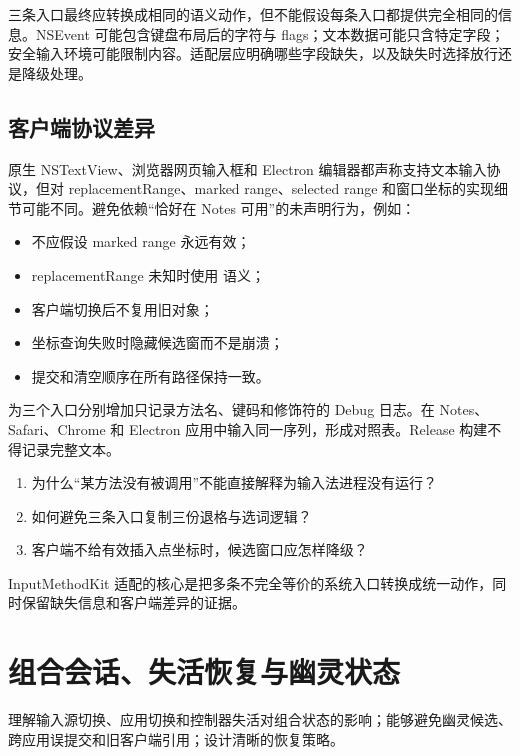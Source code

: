 三条入口最终应转换成相同的语义动作，但不能假设每条入口都提供完全相同的信息。NSEvent 可能包含键盘布局后的字符与 flags；文本数据可能只含特定字段；安全输入环境可能限制内容。适配层应明确哪些字段缺失，以及缺失时选择放行还是降级处理。

\section{客户端协议差异}

原生 NSTextView、浏览器网页输入框和 Electron 编辑器都声称支持文本输入协议，但对 replacementRange、marked range、selected range 和窗口坐标的实现细节可能不同。避免依赖“恰好在 Notes 可用”的未声明行为，例如：

\begin{itemize}
  \item 不应假设 marked range 永远有效；
  \item replacementRange 未知时使用  语义；
  \item 客户端切换后不复用旧对象；
  \item 坐标查询失败时隐藏候选窗而不是崩溃；
  \item 提交和清空顺序在所有路径保持一致。
\end{itemize}

\begin{lab}[事件路径日志]
为三个入口分别增加只记录方法名、键码和修饰符的 Debug 日志。在 Notes、Safari、Chrome 和 Electron 应用中输入同一序列，形成对照表。Release 构建不得记录完整文本。
\end{lab}

\exercises
\begin{enumerate}
  \item 为什么“某方法没有被调用”不能直接解释为输入法进程没有运行？
  \item 如何避免三条入口复制三份退格与选词逻辑？
  \item 客户端不给有效插入点坐标时，候选窗口应怎样降级？
\end{enumerate}

\begin{summarybox}
InputMethodKit 适配的核心是把多条不完全等价的系统入口转换成统一动作，同时保留缺失信息和客户端差异的证据。
\end{summarybox}


\chapter{组合会话、失活恢复与幽灵状态}

\begin{goals}
理解输入源切换、应用切换和控制器失活对组合状态的影响；能够避免幽灵候选、跨应用误提交和旧客户端引用；设计清晰的恢复策略。
\end{goals}

